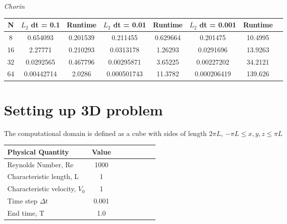 \documentclass[a4paper,norsk]{article}
\begin{document}
\textit{Chorin}

\begin{table}[ht]
\centering
\begin{tabular}{c|ccccccc}
\hline
\rowcolor{LightCyan}
N  &  $L_2$ dt = 0.1 & Runtime & $L_2$ dt = 0.01 & Runtime  & $L_2$ dt = 0.001  & Runtime\\
\hline
8 & 0.654093 & 0.201539 & 0.211455 &  0.629664 & 0.201475 & 10.4995 \\ \hline
\rowcolor{LightCyan}
16 & 2.27771 & 0.210293 & 0.0313178 &  1.26293 &  0.0291696 & 13.9263 \\ \hline
32 &0.0292565 & 0.467796 & 0.00295871 & 3.65225  & 0.00227202 & 34.2121 \\ \hline
\rowcolor{LightCyan}
64 & 0.00442714 & 2.0286 & 0.000501743 & 11.3782 & 0.000206419 & 139.626 \\
\hline
\end{tabular}
\end{table}




\section*{Setting up 3D problem}
The computational domain is defined as a cube with sides of length $2 \pi L$, $-\pi L \leq x,y,z \leq \pi L$

\begin{tabular}{l*{6}{c}r}
Physical Quantity              & Value  \\
\hline
Reynolds Number, Re & 1000   \\
Characteristic length, L           & 1     \\
Characteristic velocity, $V_{0}$   & 1     \\
Time step $\Delta t$ 			   & 0.001 \\
End time, T 					   & 1.0
\end{tabular}
\end{document}
